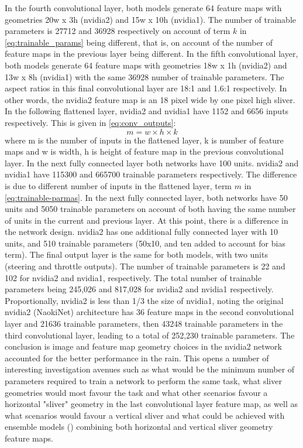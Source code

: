 In the fourth convolutional layer, both models generate 64 feature maps with geometries 20w x 3h (nvidia2) and 15w x 10h (nvidia1). The number of trainable parameters is 27712 and 36928 respectively on account of term $k$ in \ref{eq:trainable_params} being different, that is, on account of the number of feature maps in the previous layer being different.  
In the fifth convolutional layer, both models generate 64 feature maps with geometries 18w x 1h (nvidia2) and 13w x 8h (nvidia1) with the same 36928 number of trainable parameters. The aspect ratios in this final convolutional layer are 18:1 and 1.6:1 respectively. In other words, the nvidia2 feature map is an 18 pixel wide by one pixel high sliver.  
In the following flattened layer, nvidia2 and nvidia1 have 1152 and 6656 inputs respectively. This is given in \ref{eq:conv_outputs}:
\begin{equation}
    \label{eq:conv_outputs}
    m = w \times h \times k
\end{equation}
where m is the number of inputs in the flattened layer, k is number of feature maps and w is width, h is height of feature map in the previous convolutional layer.  
In the next fully connected layer both networks have 100 units. nvidia2 and nvidia1 have 115300 and 665700 trainable parameters respectively. The difference is due to different number of inputs in the flattened layer, term $m$ in \ref{eq:trainable-parmas}.  
In the next fully connected layer, both networks have 50 units and 5050 trainable parameters on account of both having the same number of units in the current and previous layer.  
At this point, there is a difference in the network design. nvidia2 has one additional fully connected layer with 10 units, and 510 trainable parameters (50x10, and ten added to account for bias term). The final output layer is the same for both models, with two units (steering and throttle outputs). The number of trainable parameters is 22 and 102 for nvidia2 and nvidia1, respectively.  
The total number of trainable parameters being 245,026 and 817,028 for nvidia2 and nvidia1 respectively. Proportionally, nvidia2 is less than 1/3 the size of nvidia1, noting the original nvidia2 (NaokiNet) architecture has 36 feature maps in the second convolutional layer and 21636 trainable parameters, then 43248 trainable parameters in the third convolutional layer, leading to a total of 252,230 trainable parameters.  
The conclusion is image and feature map geometry choices in the nvidia2 network accounted for the better performance in the rain. This opens a number of interesting investigation avenues such as what would be the minimum number of parameters required to train a network to perform the same task, what sliver geometries would most favour the task and what other scenarios favour a horizontal "sliver" geometry in the last convolutional layer feature map, as well as what scenarios would favour a vertical sliver and what could be achieved with ensemble models (\cite{ren2016ensemble}) combining both horizontal and vertical sliver geometry feature maps.


